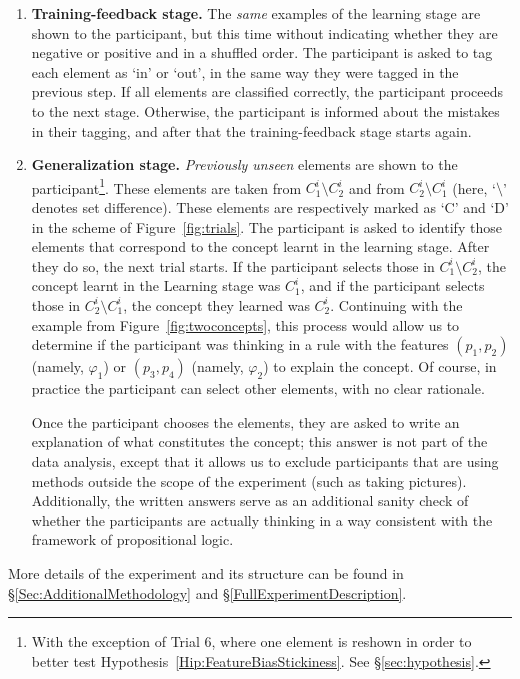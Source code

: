\begin{enumerate}
    \item {\bf Training-feedback stage.} The {\em same} examples of the learning stage are shown to the participant, but this time without indicating whether they are negative or positive and in a shuffled order. The participant is asked to tag each element as `in' or `out', in the same way they were tagged in the previous step. If all elements are classified correctly, the participant proceeds to the next stage. Otherwise, the participant is informed about the mistakes in their tagging, and after that the training-feedback stage starts again.
    
    \item {\bf Generalization stage.} {\em Previously unseen} elements are shown to the participant\footnote{With the exception of Trial 6, where one element is reshown in order to better test Hypothesis~\ref{Hip:FeatureBiasStickiness}. See \S\ref{sec:hypothesis}.}. These elements are taken from $C^i_1\setminus C^i_2$ and from $C^i_2\setminus C^i_1$ (here, `$\setminus$' denotes set difference). These elements are respectively marked as `{\sf C}' and `{\sf D}' in the scheme of Figure~\ref{fig:trials}. The participant is asked to identify those elements that correspond to the concept learnt in the learning stage. After they do so,  the next trial starts. If the participant selects those in $C^i_1\setminus C^i_2$, the concept learnt in the Learning stage was $C^i_1$, and if the participant selects those in $C^i_2\setminus C^i_1$, the concept they learned was $C^i_2$.
    Continuing with the example from Figure~\ref{fig:twoconcepts}, this process would allow us to determine if the participant was thinking in a rule with the features $(p_1, p_2)$ (namely, $\varphi_1$) or $(p_3, p_4)$ (namely, $\varphi_2$) to explain the concept. Of course, in practice the participant can select other elements, with no clear rationale.
    
    Once the participant chooses the elements, they are asked to write an explanation of what constitutes the concept; this answer is not part of the data analysis, except that it allows us to exclude participants that are using methods outside the scope of the experiment (such as taking pictures). Additionally, the written answers serve as an additional sanity check of whether the participants are actually thinking in a way consistent with the framework of propositional logic.
\end{enumerate}

More details of the experiment and its structure can be found in \S\ref{Sec:AdditionalMethodology} and \S\ref{FullExperimentDescription}.

